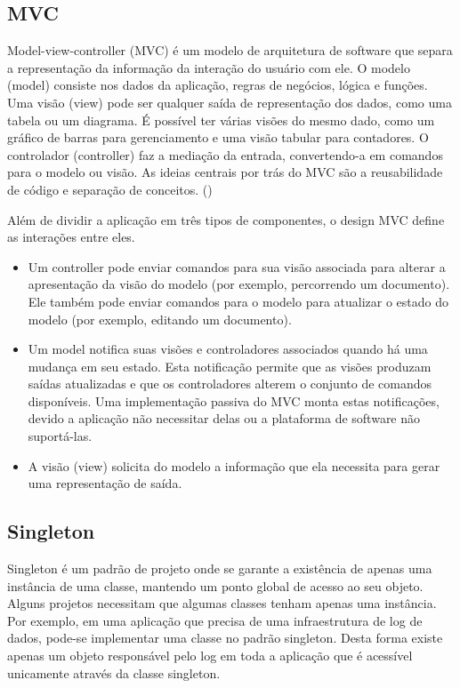 \subsection{MVC}

Model-view-controller (MVC) é um modelo de arquitetura de software que separa a representação da informação da interação do usuário com ele. O modelo (model) consiste nos dados da aplicação, regras de negócios, lógica e funções. Uma visão (view) pode ser qualquer saída de representação dos dados, como uma tabela ou um diagrama. É possível ter várias visões do mesmo dado, como um gráfico de barras para gerenciamento e uma visão tabular para contadores. O controlador (controller) faz a mediação da entrada, convertendo-a em comandos para o modelo ou visão. As ideias centrais por trás do MVC são a reusabilidade de código e separação de conceitos. (\textcite{mvc_xerox:1978})

Além de dividir a aplicação em três tipos de componentes, o design MVC define as interações entre eles.

\begin{itemize}
	\item Um controller pode enviar comandos para sua visão associada para alterar a apresentação da visão do modelo (por exemplo, percorrendo um documento). Ele também pode enviar comandos para o modelo para atualizar o estado do modelo (por exemplo, editando um documento).
	\item Um model notifica suas visões e controladores associados quando há uma mudança em seu estado. Esta notificação permite que as visões produzam saídas atualizadas e que os controladores alterem o conjunto de comandos disponíveis. Uma implementação passiva do MVC monta estas notificações, devido a aplicação não necessitar delas ou a plataforma de software não suportá-las.
	\item A visão (view) solicita do modelo a informação que ela necessita para gerar uma representação de saída. 
\end{itemize}

\subsection{Singleton}
Singleton é um padrão de projeto onde se garante a existência de apenas uma instância de uma classe, mantendo um ponto global de acesso ao seu objeto. Alguns projetos necessitam que algumas classes tenham apenas uma instância. Por exemplo, em uma aplicação que precisa de uma infraestrutura de log de dados, pode-se implementar uma classe no padrão singleton. Desta forma existe apenas um objeto responsável pelo log em toda a aplicação que é acessível unicamente através da classe singleton.

